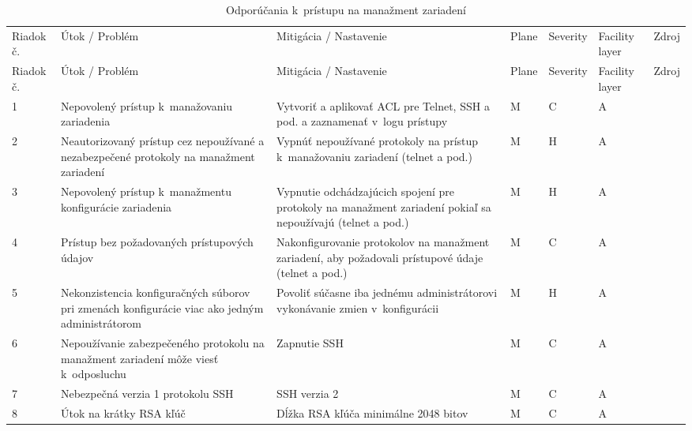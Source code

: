 \begin{longtable}[!htbp]{|C{2.5em}L{11em}L{11em}C{2.5em}C{4em}C{5em}L{2.5em}|}
	\caption{Odporúčania k~prístupu na manažment zariadení}
	\label{tab:managemnet}\\ \hline
	\mbox{Riadok} č.&Útok / Problém	&Mitigácia / Nastavenie	& Plane 	&Severity	&Facility layer	&Zdroj\\ \hhline{=======}
	\endfirsthead 
	\hline
	\centering
	
	Riadok č.	&Útok / Problém	&Mitigácia / Nastavenie	&Plane	&Severity	&Facility layer	&Zdroj\\ \hhline{=======}
	\endhead
	
	 1	&Nepovolený prístup k~manažovaniu zariadenia	&Vytvoriť a aplikovať ACL pre Telnet, SSH a pod. a zaznamenať v~logu prístupy	&M	&C	&A	& \cite{Akin2002}
	
	\cite{CIS_DrTLsgXv24lxeIIM}	\\
	2	&Neautorizovaný prístup cez nepoužívané a nezabezpečené protokoly na manažment zariadení	&Vypnúť nepoužívané protokoly na prístup k~manažovaniu zariadení (telnet a pod.)	&M	&H	&A	& \cite{CIS_DrTLsgXv24lxeIIM}
	
	\cite{Singh2018}
	\\
	 3	&Nepovolený prístup k~manažmentu konfigurácie zariadenia	&Vypnutie odchádzajúcich spojení pre protokoly na manažment zariadení pokiaľ sa nepoužívajú (telnet a pod.)	&M	&H	&A	& \cite{Singh2018}	\\
	4	&Prístup bez požadovaných prístupových údajov	&Nakonfigurovanie protokolov na manažment zariadení, aby požadovali prístupové údaje (telnet a pod.)	&M	&C	&A	& \cite{CIS_DrTLsgXv24lxeIIM}	\\
	 5	&Nekonzistencia konfiguračných súborov pri zmenách konfigurácie viac ako jedným administrátorom	&Povoliť súčasne iba jednému administrátorovi vykonávanie zmien v~konfigurácii	&M	&H	&A	& \cite{Singh2018}	\\
	6	&Nepoužívanie zabezpečeného protokolu na manažment zariadení môže viesť k~odposluchu	&Zapnutie SSH	&M	&C	&A	& \cite{CIS_DrTLsgXv24lxeIIM}
	
	\cite{Graesser2001}	\\
	 7	&Nebezpečná verzia 1 protokolu SSH	&SSH verzia 2	&M	&C	&A	& \cite{McMillan2018}	\\
	8	&Útok na krátky RSA kľúč	&Dĺžka RSA kľúča minimálne 2048 bitov	&M	&C	&A	& \cite{CIS_DrTLsgXv24lxeIIM}
	

\end{longtable}
